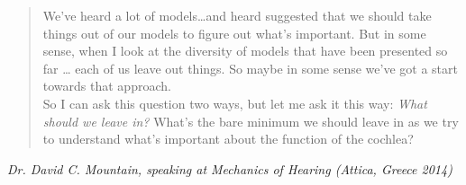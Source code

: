 \phantom{.}
\vspace{4in}

\begin{singlespace}
\begin{quote}
  We've heard a lot of models\ldots{}and heard suggested that we should take things out of our models to figure out what's important.  But in some sense, when I look at the diversity of models that have been presented so far \ldots{} each of us leave out things.  So maybe in some sense we've got a start towards that approach.\\  
  
  So I can ask this question two ways, but let me ask it this way: \emph{What should we leave in?} What's the bare minimum we should leave in as we try to understand what's important about the function of the cochlea?
\end{quote}
\end{singlespace}
  
\vspace{5em}
\textit{Dr. David C. Mountain, speaking at Mechanics of Hearing (Attica, Greece 2014)}

%

